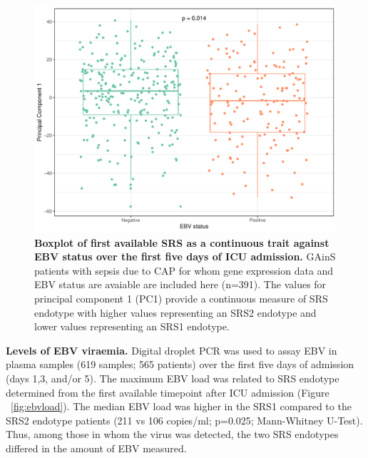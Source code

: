\begin{figure}[htbp]
\centering
\includegraphics[scale=0.6]{./Results3/Images/SRS_jitter.pdf}
\caption[EBV-positivity and SRS status]{\textbf{Boxplot of first available SRS as a continuous trait against EBV status over the first five days of ICU admission.} GAinS patients with sepsis due to CAP for whom gene expression data and EBV status are avaiable are included here (n=391). The values for principal component 1 (PC1) provide a continuous measure of SRS endotype with higher values representing an SRS2 endotype and lower values representing an SRS1 endotype. }
\label{fig:ebvsrs}
\end{figure}
\FloatBarrier

\textbf{Levels of EBV viraemia.} 
Digital droplet PCR was used to assay EBV in plasma samples (619 samples; 565 patients) over the first five days of admission (days 1,3, and/or 5). The maximum EBV load was related to SRS endotype determined from the first available timepoint after ICU admission (Figure ~\ref{fig:ebvload}). The median EBV load was higher in the SRS1 compared to the SRS2 endotype patients (211 vs 106 copies/ml; p=0.025; Mann-Whitney U-Test). Thus, among those in whom the virus was detected, the two SRS endotypes differed in the amount of EBV measured.

